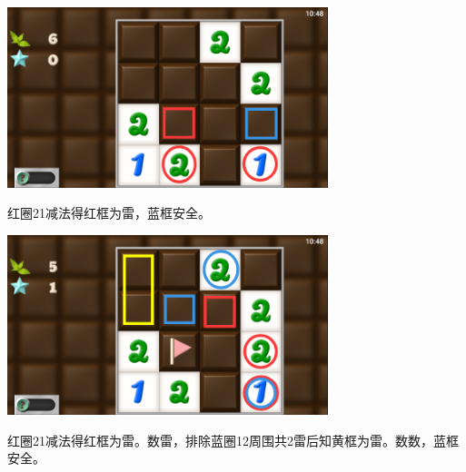 \subsection{} %
\begin{center}
    \includegraphics[width=0.7\textwidth]{puzzle/121-1.png}
\end{center}
红圈21减法得红框为雷，蓝框安全。
\begin{center}
    \includegraphics[width=0.7\textwidth]{puzzle/121-2.png}
\end{center}
红圈21减法得红框为雷。数雷，排除蓝圈12周围共2雷后知黄框为雷。数数，蓝框安全。

